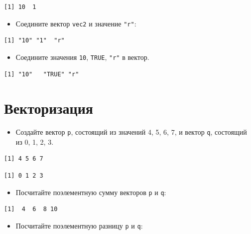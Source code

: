 \documentclass[
]{book}
\providecommand{\tightlist}{%
  \setlength{\itemsep}{0pt}\setlength{\parskip}{0pt}}
\begin{document}
\begin{verbatim}
[1] 10  1
\end{verbatim}

\begin{itemize}
\tightlist
\item
  Соедините вектор \texttt{vec2} и значение \texttt{"r"}:
\end{itemize}

\begin{verbatim}
[1] "10" "1"  "r" 
\end{verbatim}

\begin{itemize}
\tightlist
\item
  Соедините значения \texttt{10}, \texttt{TRUE}, \texttt{"r"} в вектор.
\end{itemize}

\begin{verbatim}
[1] "10"   "TRUE" "r"   
\end{verbatim}

\hypertarget{task_vec_ion}{%
\section{Векторизация}\label{task_vec_ion}}

\begin{itemize}
\tightlist
\item
  Создайте вектор \texttt{p}, состоящий из значений 4, 5, 6, 7, и вектор \texttt{q}, состоящий из 0, 1, 2, 3.
\end{itemize}

\begin{verbatim}
[1] 4 5 6 7
\end{verbatim}

\begin{verbatim}
[1] 0 1 2 3
\end{verbatim}

\begin{itemize}
\tightlist
\item
  Посчитайте поэлементную сумму векторов \texttt{p} и \texttt{q}:
\end{itemize}

\begin{verbatim}
[1]  4  6  8 10
\end{verbatim}

\begin{itemize}
\tightlist
\item
  Посчитайте поэлементную разницу \texttt{p} и \texttt{q}:
\end{itemize}
\end{document}
